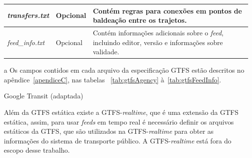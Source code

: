 \documentclass[
	12pt,				%
	oneside,			%
	a4paper,			%
	english,			%
	brazil				%
	]{abntex2ppgsi}
\begin{document}
{{{\begin{table}[!htb]
\begin{threeparttable}
\begin{tabular}{>{\centering\arraybackslash}m{3.5cm} | >{\centering}m{3cm} | >{\centering\arraybackslash}m{8cm}}
\hline
\textit{transfers.txt }& Opcional & Contém regras para conexões em pontos de baldeação entre os trajetos. \\
\hline
\textit{feed\_info.txt} & Opcional & Contém informações adicionais sobre o \textit{feed}, incluindo editor, versão e informações sobre validade. \\
\bottomrule
  \end{tabular}
  \begin{tablenotes}
            \item[a] Os campos contidos em cada arquivo da especificação GTFS estão descritos no apêndice~\ref{apendiceC}, nas tabelas ~\ref{tab:gtfsAgency} à~\ref{tab:gtfsFeedInfo}.
        \end{tablenotes}
\end{threeparttable}
 Google Transit (adaptada)
\end{table}

Além da GTFS estática existe a GTFS-\textit{realtime}, que é uma extensão da GTFS estática, assim, para usar \textit{feeds} em tempo real é necessário definir os arquivos estáticos da GTFS, que são utilizados na GTFS-\textit{realtime} para obter as informações do sistema de transporte público. A GTFS-\textit{realtime} está fora do escopo desse trabalho.

}}}
\end{document}
